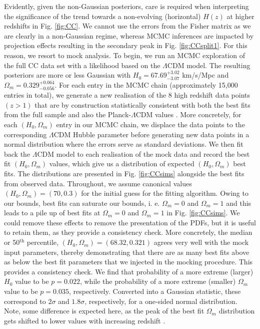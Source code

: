 \documentclass[a4paper,11pt]{article}
\begin{document}
Evidently, given the non-Gaussian posteriors, care is required when interpreting the significance of the trend towards a non-evolving (horizontal) $H(z)$ at higher redshifts in Fig. \ref{fig:CC}. We cannot use the errors from the Fisher matrix as we are clearly in a non-Gaussian regime, whereas MCMC inferences are impacted by projection effects resulting in the secondary peak in Fig. \ref{fig:CCsplit1}. For this reason, we resort to mock analysis. To begin, we run an MCMC exploration of the full CC data set with a likelihood based on the $\Lambda$CDM model. The resulting posteriors are more or less Gaussian with $H_0 = 67.69^{+3.02}_{-3.07}$ km/s/Mpc and $\Omega_m = 0.329^{+0.064}_{-0.056}$. For each entry in the MCMC chain (approximately 15,000 entries in total), we generate a new realisation of the 8 high redshift data points $(z > 1)$ that are by construction statistically consistent with both the best fits from the full sample and also the Planck-$\Lambda$CDM values \cite{Planck:2018vyg}. More concretely, for each $(H_0, \Omega_m)$ entry in our MCMC chain, we displace the data points to the corresponding $\Lambda$CDM Hubble parameter before generating new data points in a normal distribution where the errors serve as standard deviations. We then fit back the $\Lambda$CDM model to each realisation of the mock data and record the best fit $(H_0, \Omega_m)$ values, which give us a distribution of expected $(H_0, \Omega_m)$ best fits. The distributions are presented in Fig. \ref{fig:CCsims} alongside the best fits from observed data. Throughout, we assume canonical values $(H_0, \Omega_m) = (70, 0.3)$ for the initial guess for the fitting algorithm. Owing to our bounds, best fits can saturate our bounds, i. e. $\Omega_m = 0$ and $\Omega_m = 1$ and this leads to a pile up of best fits at $\Omega_m = 0$ and $\Omega_m = 1$ in Fig. \ref{fig:CCsims}. We could remove these effects to remove the presentation of the PDFs, but it is useful to retain them, as they provide a consistency check. More concretely, the median or 50$^{\textrm{th}}$ percentile, $(H_0, \Omega_m) = (68.32, 0.321)$ agrees very well with the mock input parameters, thereby demonstrating that there are as many best fits above as below the best fit parameters that we injected in the mocking procedure. This provides a consistency check. We find that probability of a more extreme (larger) $H_0$ value to be $p = 0.022$, while the probability of a more extreme (smaller) $\Omega_m$ value to be $p = 0.035$, respectively. Converted into a Gaussian statistic, these correspond to $2 \sigma$ and $1.8 \sigma$, respectively, for a one-sided normal distribution. Note, some difference is expected here, as the peak of the best fit $\Omega_m$ distribution gets shifted to lower values with increasing redshift \cite{Colgain:2022tql}. 
\end{document}
